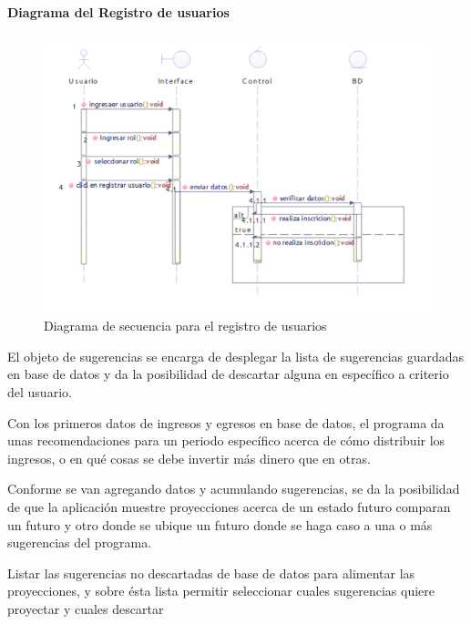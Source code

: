 \paragraph{Diagrama del Registro de usuarios}
\begin{figure}[H]
	\centering
	\includegraphics[width=0.8\linewidth]{parte2/imgs/DiagramaSecuencia/RegUsu}
	\caption[Diagrama de secuencia Registrar Usuario]{Diagrama de secuencia para el registro de usuarios}
	\label{fig:diagramadesecuencia2}
\end{figure}

El objeto de sugerencias se encarga de desplegar la lista de sugerencias guardadas en base de datos y da la posibilidad de descartar alguna en específico a criterio del usuario.

Con los primeros datos de ingresos y egresos en base de datos, el programa da unas recomendaciones para un periodo específico acerca de cómo distribuir los ingresos, o en qué cosas se debe invertir más dinero que en otras.

Conforme se van agregando datos y acumulando sugerencias, se da la posibilidad de que la aplicación muestre proyecciones acerca de un estado futuro comparan un futuro y otro donde se ubique un futuro donde se haga caso a una o más sugerencias del programa.

Listar las sugerencias no descartadas de base de datos para alimentar las proyecciones, y sobre ésta lista permitir seleccionar cuales sugerencias quiere proyectar y cuales descartar

